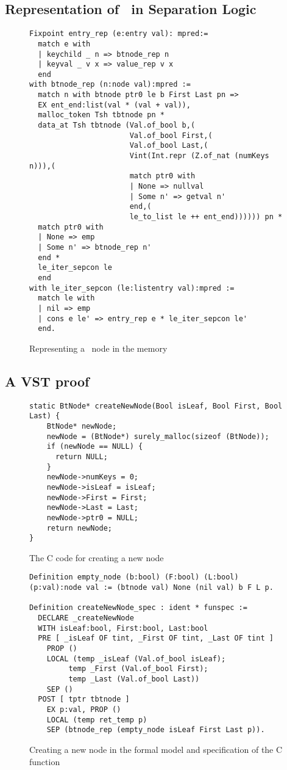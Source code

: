 \subsection{Representation of \btrees\ in Separation Logic}

\begin{figure}
\begin{lstlisting}[language=Coq]
Fixpoint entry_rep (e:entry val): mpred:=
  match e with
  | keychild _ n => btnode_rep n
  | keyval _ v x => value_rep v x
  end
with btnode_rep (n:node val):mpred :=
  match n with btnode ptr0 le b First Last pn =>
  EX ent_end:list(val * (val + val)),
  malloc_token Tsh tbtnode pn *
  data_at Tsh tbtnode (Val.of_bool b,(
                       Val.of_bool First,(
                       Val.of_bool Last,(
                       Vint(Int.repr (Z.of_nat (numKeys n))),(
                       match ptr0 with
                       | None => nullval
                       | Some n' => getval n'
                       end,(
                       le_to_list le ++ ent_end)))))) pn *
  match ptr0 with
  | None => emp
  | Some n' => btnode_rep n'
  end *
  le_iter_sepcon le
  end
with le_iter_sepcon (le:listentry val):mpred :=
  match le with
  | nil => emp
  | cons e le' => entry_rep e * le_iter_sepcon le'
  end.
\end{lstlisting}
\caption{Representing a \btree\ node in the memory}
\label{btnoderep}
\end{figure}

\newpage
\subsection{A VST proof}
\label{subsec:proof}
\begin{figure}
  \begin{lstlisting}
static BtNode* createNewNode(Bool isLeaf, Bool First, Bool Last) {
    BtNode* newNode;
    newNode = (BtNode*) surely_malloc(sizeof (BtNode));
    if (newNode == NULL) {
      return NULL;
    }
    newNode->numKeys = 0;
    newNode->isLeaf = isLeaf;
    newNode->First = First;
    newNode->Last = Last;
    newNode->ptr0 = NULL;
    return newNode;
}
  \end{lstlisting}
  \caption{The C code for creating a new node}
\end{figure}

\begin{figure}
  \begin{lstlisting}[language=Coq]
Definition empty_node (b:bool) (F:bool) (L:bool) (p:val):node val := (btnode val) None (nil val) b F L p.
    
Definition createNewNode_spec : ident * funspec :=
  DECLARE _createNewNode
  WITH isLeaf:bool, First:bool, Last:bool
  PRE [ _isLeaf OF tint, _First OF tint, _Last OF tint ]
    PROP ()
    LOCAL (temp _isLeaf (Val.of_bool isLeaf);
         temp _First (Val.of_bool First);
         temp _Last (Val.of_bool Last))
    SEP ()
  POST [ tptr tbtnode ]
    EX p:val, PROP ()
    LOCAL (temp ret_temp p)
    SEP (btnode_rep (empty_node isLeaf First Last p)).
  \end{lstlisting}
  \caption{Creating a new node in the formal model and specification of the C function}
\end{figure}

